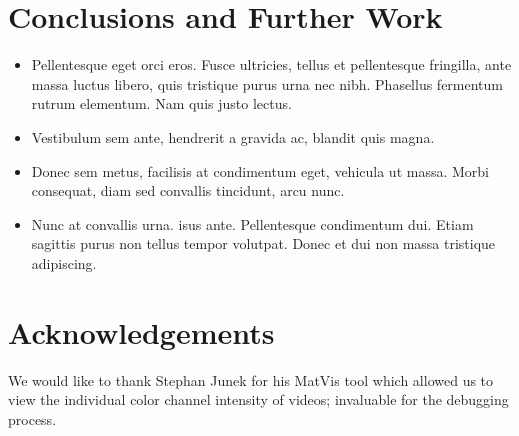 \documentclass[a0,landscape]{a0poster}
\begin{document}
\begin{multicols}{4}

\color{SaddleBrown} %

\section*{Conclusions and Further Work}

\begin{itemize}
\item Pellentesque eget orci eros. Fusce ultricies, tellus et pellentesque fringilla, ante massa luctus libero, quis tristique purus urna nec nibh. Phasellus fermentum rutrum elementum. Nam quis justo lectus.
\item Vestibulum sem ante, hendrerit a gravida ac, blandit quis magna.
\item Donec sem metus, facilisis at condimentum eget, vehicula ut massa. Morbi consequat, diam sed convallis tincidunt, arcu nunc.
\item Nunc at convallis urna. isus ante. Pellentesque condimentum dui. Etiam sagittis purus non tellus tempor volutpat. Donec et dui non massa tristique adipiscing.
\end{itemize}

\color{DarkSlateGray} %



\nocite{*} %


\section*{Acknowledgements}

We would like to thank Stephan Junek for his MatVis tool which allowed us to view the individual color channel intensity of videos; invaluable for the debugging process.


\end{multicols}
\end{document}

